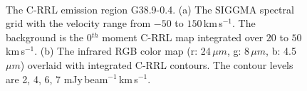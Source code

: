 \documentclass[manuscript]{aastex61}
\newcommand{\kms}{\,km\,s$^{-1}$}
\newcommand{\um}{\mu m}
\begin{document}
\begin{figure}[H]
\centering
{}
\\
\caption{The C-RRL emission region G38.9-0.4.
          (a) The SIGGMA spectral grid with the velocity range from $-50$ to $150$\kms.
	  The background is the 0$^{th}$ moment C-RRL map integrated over $20$ to $50$\kms.
	  (b) The infrared RGB color map (r: 24\,$\um$, g: 8\,$\um$, b: 4.5\,$\um$) overlaid with integrated C-RRL contours.
	  The contour levels are 2, 4, 6, 7 mJy\,beam$^{-1}$\kms.}
\label{fig_crrl-g389}
\end{figure}
\end{document}
